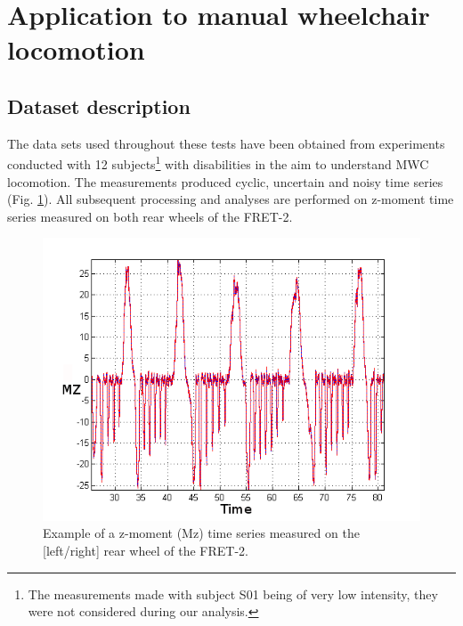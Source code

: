 
\section{Application to manual wheelchair locomotion}
\subsection{Dataset description}
The data sets used throughout these tests have been obtained from experiments  conducted with 12 subjects\footnote{The measurements made with subject S01 being of very low intensity, they were not considered during our analysis.} with disabilities in the aim to understand MWC locomotion. The measurements produced cyclic, uncertain and noisy time series (Fig. \ref{TWMWC}). All subsequent processing and analyses are performed on z-moment time series measured on both rear wheels of the FRET-2.

\begin{figure}[h]
\center
\includegraphics[scale = 0.5]{images/TSMWC}
\caption{Example of a z-moment (Mz) time series measured on the [left/right] rear wheel of the FRET-2.}
\label{TWMWC}
\end{figure}

